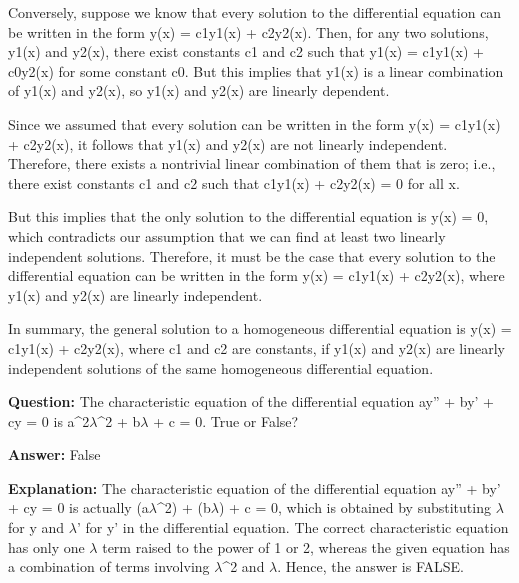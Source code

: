 \documentclass{article}
\begin{document}
Conversely, suppose we know that every solution to the differential equation can be written in the form y(x) = c1y1(x) + c2y2(x). Then, for any two solutions, y1(x) and y2(x), there exist constants c1 and c2 such that y1(x) = c1y1(x) + c0y2(x) for some constant c0. But this implies that y1(x) is a linear combination of y1(x) and y2(x), so y1(x) and y2(x) are linearly dependent.

Since we assumed that every solution can be written in the form y(x) = c1y1(x) + c2y2(x), it follows that y1(x) and y2(x) are not linearly independent. Therefore, there exists a nontrivial linear combination of them that is zero; i.e., there exist constants c1 and c2 such that c1y1(x) + c2y2(x) = 0 for all x.

But this implies that the only solution to the differential equation is y(x) = 0, which contradicts our assumption that we can find at least two linearly independent solutions. Therefore, it must be the case that every solution to the differential equation can be written in the form y(x) = c1y1(x) + c2y2(x), where y1(x) and y2(x) are linearly independent.

In summary, the general solution to a homogeneous differential equation is y(x) = c1y1(x) + c2y2(x), where c1 and c2 are constants, if y1(x) and y2(x) are linearly independent solutions of the same homogeneous differential equation.
                
                \vspace{0.5cm} 
        
            
                \textbf {Question:} The characteristic equation of the differential equation ay'' + by' + cy = 0 is a{\textasciicircum}2\ensuremath{\lambda}{\textasciicircum}2 + b\ensuremath{\lambda} + c = 0. True or False?
                
                \textbf{Answer:} False

                \textbf{Explanation:} The characteristic equation of the differential equation ay'' + by' + cy = 0 is actually (a\ensuremath{\lambda}{\textasciicircum}2) + (b\ensuremath{\lambda}) + c = 0, which is obtained by substituting \ensuremath{\lambda} for y and \ensuremath{\lambda}' for y' in the differential equation. The correct characteristic equation has only one \ensuremath{\lambda} term raised to the power of 1 or 2, whereas the given equation has a combination of terms involving \ensuremath{\lambda}{\textasciicircum}2 and \ensuremath{\lambda}. Hence, the answer is FALSE.
                
\end{document}
